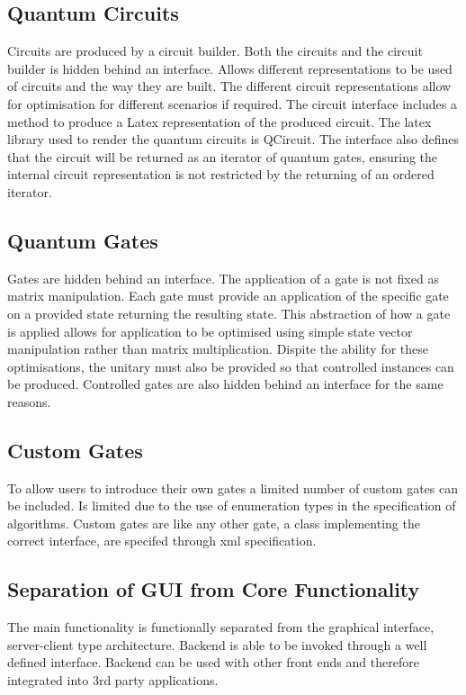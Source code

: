 \documentclass[authoryearcitations]{UoYCSproject}
\begin{document}
\subsection{Quantum Circuits}
Circuits are produced by a circuit builder.
Both the circuits and the circuit builder is hidden behind an interface.
Allows different representations to be used of circuits and the way they are built.
The different circuit representations allow for optimisation for different scenarios if required.
The circuit interface includes a method to produce a Latex representation of the produced circuit.
The latex library used to render the quantum circuits is QCircuit.
The interface also defines that the circuit will be returned as an iterator of quantum gates, ensuring the internal circuit representation is not restricted by the returning of an ordered iterator.

\subsection{Quantum Gates}
Gates are hidden behind an interface.
The application of a gate is not fixed as matrix manipulation.
Each gate must provide an application of the specific gate on a provided state returning the resulting state.
This abstraction of how a gate is applied allows for application to be optimised using simple state vector manipulation rather than matrix multiplication.
Dispite the ability for these optimisations, the unitary must also be provided so that controlled instances can be produced.
Controlled gates are also hidden behind an interface for the same reasons.

\subsection{Custom Gates}
To allow users to introduce their own gates a limited number of custom gates can be included.
Is limited due to the use of enumeration types in the specification of algorithms.
Custom gates are like any other gate, a class implementing the correct interface, are specifed through xml specification.

\subsection{Separation of GUI from Core Functionality}
The main functionality is functionally separated from the graphical interface, server-client type architecture.
Backend is able to be invoked through a well defined interface.
Backend can be used with other front ends and therefore integrated into 3rd party applications.
\end{document}
